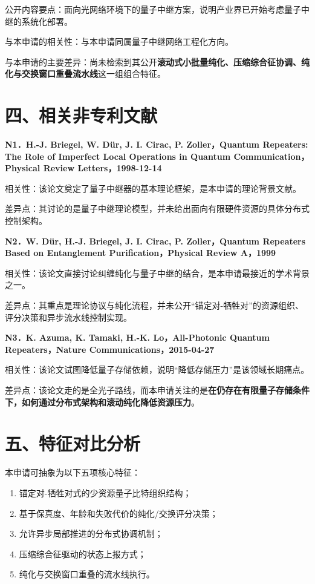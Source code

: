 \documentclass[12pt,a4paper]{article}
\begin{document}
公开内容要点：面向光网络环境下的量子中继方案，说明产业界已开始考虑量子中继的系统化部署。

与本申请的相关性：与本申请同属量子中继网络工程化方向。

与本申请的主要差异：尚未检索到其公开\textbf{滚动式小批量纯化、压缩综合征协调、纯化与交换窗口重叠流水线}这一组组合特征。

\section*{四、相关非专利文献}

\textbf{N1．H.-J. Briegel, W. D\"ur, J. I. Cirac, P. Zoller，Quantum Repeaters: The Role of Imperfect Local Operations in Quantum Communication，Physical Review Letters，1998-12-14}

相关性：该论文奠定了量子中继器的基本理论框架，是本申请的理论背景文献。

差异点：其讨论的是量子中继理论模型，并未给出面向有限硬件资源的具体分布式控制架构。

\vspace{0.5em}
\textbf{N2．W. D\"ur, H.-J. Briegel, J. I. Cirac, P. Zoller，Quantum Repeaters Based on Entanglement Purification，Physical Review A，1999}

相关性：该论文直接讨论纠缠纯化与量子中继的结合，是本申请最接近的学术背景之一。

差异点：其重点是理论协议与纯化流程，并未公开“锚定对-牺牲对”的资源组织、评分决策和异步流水线控制实现。

\vspace{0.5em}
\textbf{N3．K. Azuma, K. Tamaki, H.-K. Lo，All-Photonic Quantum Repeaters，Nature Communications，2015-04-27}

相关性：该论文试图降低量子存储依赖，说明“降低存储压力”是该领域长期痛点。

差异点：该论文走的是全光子路线，而本申请关注的是\textbf{在仍存在有限量子存储条件下，如何通过分布式架构和滚动纯化降低资源压力}。

\section*{五、特征对比分析}

本申请可抽象为以下五项核心特征：
\begin{enumerate}[label=F\arabic*.]
    \item 锚定对-牺牲对式的少资源量子比特组织结构；
    \item 基于保真度、年龄和失败代价的纯化/交换评分决策；
    \item 允许异步局部推进的分布式协调机制；
    \item 压缩综合征驱动的状态上报方式；
    \item 纯化与交换窗口重叠的流水线执行。
\end{enumerate}
\end{document}
